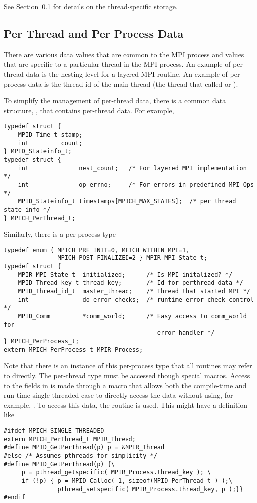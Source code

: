 \documentclass{article}
\begin{document}
See Section~\ref{sec:perthread} for details on the thread-specific storage.

\subsection{Per Thread and Per Process Data}
\label{sec:perthread}
There are various data values that are common to the MPI process and values
that are specific to a particular thread in the MPI process.  An example of
per-thread data is the nesting level for a layered MPI routine.  An example of
per-process data is the thread-id of the main thread (the thread that called
 or ). 

To simplify the management of per-thread data, there is a common data
structure, , that contains per-thread data.
For example,
% 
\begin{verbatim}
typedef struct {
    MPID_Time_t stamp;
    int         count;
} MPID_Stateinfo_t;
typedef struct {
    int              nest_count;   /* For layered MPI implementation */
    int              op_errno;     /* For errors in predefined MPI_Ops */
    MPID_Stateinfo_t timestamps[MPICH_MAX_STATES];  /* per thread state info */
} MPICH_PerThread_t;
\end{verbatim}
Similarly, there is a per-process type
\begin{verbatim}
typedef enum { MPICH_PRE_INIT=0, MPICH_WITHIN_MPI=1,
               MPICH_POST_FINALIZED=2 } MPIR_MPI_State_t;
typedef struct {
    MPIR_MPI_State_t  initialized;      /* Is MPI initalized? */
    MPID_Thread_key_t thread_key;       /* Id for perthread data */
    MPID_Thread_id_t  master_thread;    /* Thread that started MPI */
    int               do_error_checks;  /* runtime error check control */
    MPID_Comm         *comm_world;      /* Easy access to comm_world for
                                           error handler */
} MPICH_PerProcess_t;
extern MPICH_PerProcess_t MPIR_Process;
\end{verbatim}
Note that there is an instance of this per-process type that all routines may
refer to directly.  The per-thread type must be accessed though special
macros. 
Access to the fields in  is made through a macro that
allows both the compile-time and run-time single-threaded case to directly
access the data without using, for example, .
To access this data, the routine  is used.  This
might have a definition like
\begin{verbatim}
#ifdef MPICH_SINGLE_THREADED
extern MPICH_PerThread_t MPIR_Thread;
#define MPID_GetPerThread(p) p = &MPIR_Thread
#else /* Assumes pthreads for simplicity */
#define MPID_GetPerThread(p) {\
     p = pthread_getspecific( MPIR_Process.thread_key ); \
     if (!p) { p = MPID_Calloc( 1, sizeof(MPID_PerThread_t ) );\
               pthread_setspecific( MPIR_Process.thread_key, p );}}
#endif
\end{verbatim}
\end{document}
